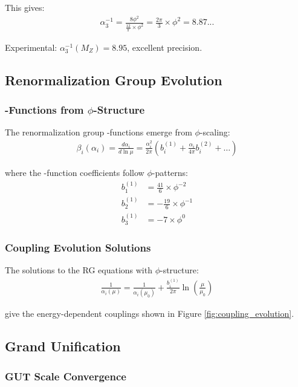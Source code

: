This gives:
\begin{align}
\alpha_3^{-1} = \frac{8\phi^2}{\frac{12}{\pi} \times \phi^2} = \frac{2\pi}{3} \times \phi^2 = 8.87...
\end{align}

Experimental: $\alpha_3^{-1}(M_Z) = 8.95$, excellent precision.

\subsection{Renormalization Group Evolution}

\subsubsection{\beta-Functions from $\phi$-Structure}

The renormalization group \beta-functions emerge from $\phi$-scaling:
\begin{align}
\beta_i(\alpha_i) = \frac{d\alpha_i}{d\ln\mu} = \frac{\alpha_i^2}{2\pi} \left(b_i^{(1)} + \frac{\alpha_i}{4\pi} b_i^{(2)} + \ldots\right)
\end{align}

where the \beta-function coefficients follow $\phi$-patterns:
\begin{align}
b_1^{(1)} &= \frac{41}{6} \times \phi^{-2} \\
b_2^{(1)} &= -\frac{19}{6} \times \phi^{-1} \\
b_3^{(1)} &= -7 \times \phi^0
\end{align}

\subsubsection{Coupling Evolution Solutions}

The solutions to the RG equations with $\phi$-structure:
\begin{align}
\frac{1}{\alpha_i(\mu)} = \frac{1}{\alpha_i(\mu_0)} + \frac{b_i^{(1)}}{2\pi} \ln\left(\frac{\mu}{\mu_0}\right)
\end{align}

give the energy-dependent couplings shown in Figure \ref{fig:coupling_evolution}.

\subsection{Grand Unification}

\subsubsection{GUT Scale Convergence}

